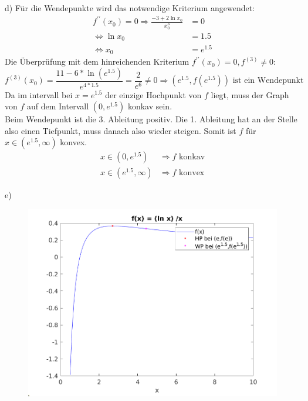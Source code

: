 \documentclass[a4paper]{article}
\begin{document}
\newpage
\setlength{\headheight}{0cm} 

\par{d)} Für die Wendepunkte wird das notwendige Kriterium angewendet:
\begin{align*}
	f^{\prime\prime} (x_0)= 0 \Rightarrow \frac{-3+2 \ln x_0}{x_0^3} &= 0\\
	\Leftrightarrow \ln x_0 &= 1.5 \\
	\Leftrightarrow x_0 &= e^{1.5}
\end{align*}
Die Überprüfung mit dem hinreichenden Kriterium $f^{\prime\prime} (x_0) = 0, f^{(3)} \neq 0$:
\[ 
	f^{(3)} (x_0) = \frac{11 - 6*\ln(e^{1.5})}{e^{4*1.5}} = \frac{2}{e^6} \neq 0 
	\Longrightarrow (e^{1.5}, f(e^{1.5})) \text{ ist ein Wendepunkt}
\]
Da im intervall bei $x = e^{1.5}$ der einzige Hochpunkt von $f$ liegt, muss der Graph von $f$ auf dem Intervall  $(0,e^{1.5})$ konkav sein. \\
Beim Wendepunkt ist die 3. Ableitung positiv. Die 1. Ableitung hat an der Stelle also einen Tiefpunkt, muss danach also wieder steigen. Somit ist $f$ für $x \in (e^{1.5}, \infty) $ konvex.
\begin{align*}
	x \in (0,e^{1.5}) &\Rightarrow f \text{ konkav} \\
	x \in (e^{1.5}, \infty) &\Rightarrow f \text{ konvex}
\end{align*}
\par{e)}
\begin{figure}[h]
	\includegraphics[width=15cm]{aufgabe1_plot.png}
\end{figure}
\newpage
\end{document}
